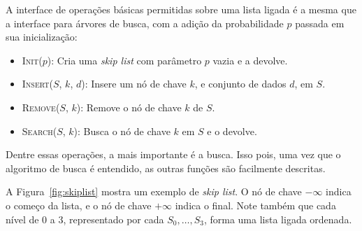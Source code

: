 \documentclass[paper=a4, fontsize=11pt]{scrartcl} %
\numberwithin{equation}{section}
\numberwithin{figure}{section}
\numberwithin{table}{section}
\numberwithin{definition}{section}
\numberwithin{theorem}{section}
\numberwithin{property}{section}
\numberwithin{proposition}{section}
\newcommand{\skl}{\textit{skip list}\xspace}
\begin{document}
A interface de operações básicas permitidas sobre uma lista ligada é a mesma que a interface
para árvores de busca, com a adição da probabilidade $p$ passada em sua inicialização:

\begin{itemize}
  \item \textsc{Init}($p$): Cria uma \skl com parâmetro $p$ vazia e a devolve.
  \item \textsc{Insert}($S$, $k$, $d$): Insere um nó de chave $k$, e conjunto de dados
                                                 $d$, em $S$.
  \item \textsc{Remove}($S$, $k$): Remove o nó de chave $k$ de $S$.
  \item \textsc{Search}($S$, $k$): Busca o nó de chave $k$ em $S$ e o devolve.
\end{itemize}

Dentre essas operações, a mais importante é a busca. Isso pois, uma vez que o algoritmo de busca é entendido,
as outras funções são facilmente descritas.


A Figura~\ref{fig:skiplist} mostra um exemplo de \skl. 
O nó de chave $-\infty$ indica o começo da lista, e o nó de chave $+\infty$ indica o final.
Note também que cada nível de 0 a 3, representado por cada $S_0, \ldots, S_3$, forma uma lista ligada ordenada.
\end{document}
